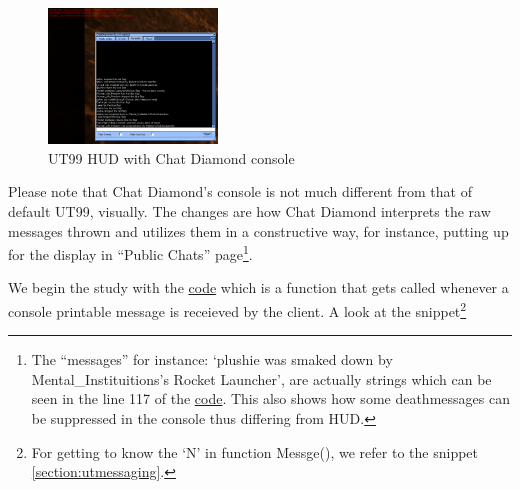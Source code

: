 \documentclass{article}
\theoremstyle{definition}
\begin{document}
\begin{figure}
\centering
\includegraphics[width=0.4\textwidth]{consoleundhud}
\caption{UT99 HUD with Chat Diamond console}
\label{fig:chatdiamond_console_hud}
\end{figure}

Please note that Chat Diamond's console is not much different from that of default UT99, visually.  The changes are how Chat Diamond interprets the raw messages thrown and utilizes them in a constructive way, for instance, putting up for the display in ``Public Chats'' page\footnote{\label{foot:hudconsolediff} The ``messages'' for instance: `plushie was smaked down by Mental\_Instituitions's Rocket Launcher', are actually strings which can be seen in the line 117 of the \href{http://uncodex.ut-files.com/UT/v436/Source_botpack/deathmessageplus.html}{code}.  This also shows how some deathmessages can be suppressed in the console thus differing from HUD.}.

We begin the study with the \href{https://github.com/ravimohan1991/ChatDiamond/blob/b27b03b444078e1fe206bd1687278fd84f9d4823/Classes/CDUTConsole.uc#L57C44-L57C44}{code} which is a function that gets called whenever a console printable message is receieved by the client.  A look at the snippet\footnote{For getting to know the `N' in function Messge(), we refer to the snippet \ref{section:utmessaging}.} 
\end{document}

